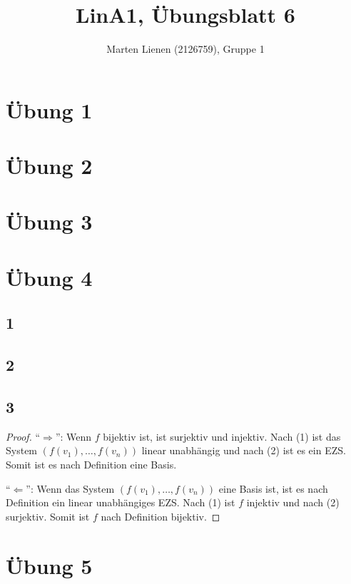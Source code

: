 \documentclass[a4paper,10pt]{article}
\title{LinA1, Übungsblatt 6}
\author{Marten Lienen (2126759), Gruppe 1}
\begin{document}
\maketitle

\section*{Übung 1}

\section*{Übung 2}

\section*{Übung 3}

\section*{Übung 4}

\subsection*{1}

\subsection*{2}

\subsection*{3}

\begin{proof}
 ``$\Rightarrow$'': Wenn $f$ bijektiv ist, ist surjektiv und injektiv.
 Nach (1) ist das System $(f(v_1), \dots, f(v_n))$ linear unabhängig und nach (2) ist es ein EZS.
 Somit ist es nach Definition eine Basis.
 
 ``$\Leftarrow$'': Wenn das System $(f(v_1), \dots, f(v_n))$ eine Basis ist, ist es nach Definition ein linear unabhängiges EZS.
 Nach (1) ist $f$ injektiv und nach (2) surjektiv.
 Somit ist $f$ nach Definition bijektiv.
\end{proof}

\section*{Übung 5}
\end{document}
